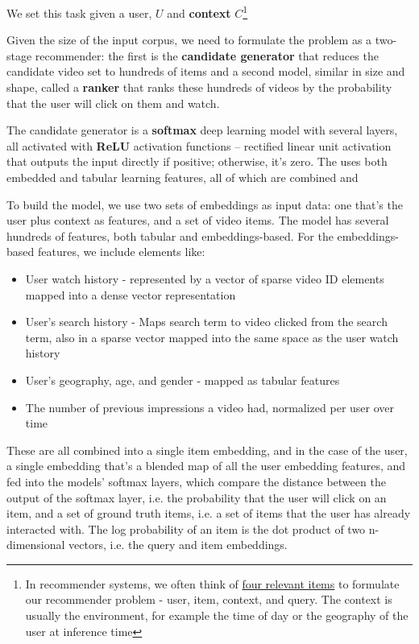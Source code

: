 \documentclass[11pt, table]{diazessay} %
\begin{document}
\begin{sloppypar}
We set this task given a user, $U$ and \textbf{context} $C$\footnote{In recommender systems, we often think of \href{https://md.ekstrandom.net/blog/2015/10/search-and-recsys}{four relevant items} to formulate our recommender problem - user, item, context, and query. The context is usually the environment, for example the time of day or the geography of the user at inference time }

Given the size of the input corpus, we need to formulate the problem as a two-stage recommender: the first is the \textbf{candidate generator} that reduces the candidate video set to hundreds of items and a second model, similar in size and shape, called a \textbf{ranker} that ranks these hundreds of videos by the probability that the user will click on them and watch.

The candidate generator is a \textbf{softmax} deep learning model with several layers, all activated with \textbf{ReLU} activation functions --  rectified linear unit activation that outputs the input directly if positive; otherwise, it's zero.  The uses both embedded and tabular learning features, all of which are combined and



To build the model, we use two sets of embeddings as input data: one that's the user plus context as features, and a set of video items. The model has several hundreds of features, both tabular and embeddings-based. For the embeddings-based features, we include elements like:

\begin{itemize}
  \item User watch history - represented by a vector of sparse video ID elements mapped into a dense vector representation
  \item User's search history - Maps search term to video clicked from the search term, also in a sparse vector mapped into the same space as the user watch history
  \item User's geography, age, and gender - mapped as tabular features
  \item The number of previous impressions a video had, normalized per user over time
\end{itemize}


These are all combined into a single item embedding, and in the case of the user, a single embedding that's a blended map of all the user embedding features, and fed into the models' softmax layers, which compare the distance between the output of the softmax layer, i.e. the probability that the user will click on an item, and a set of ground truth items, i.e. a set of items that the user has already interacted with. The log probability of an item is the dot product of two n-dimensional vectors, i.e. the query and item embeddings.


\end{sloppypar}
\end{document}
